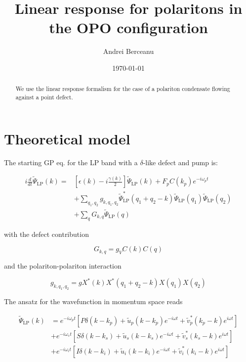 \documentclass[a4paper,prb,10pt,aps,twocolumn]{revtex4-1}
\begin{document}
\title{Linear response for polaritons in the OPO configuration}
\author{Andrei Berceanu}

\date{\today}

\begin{abstract}
We use the linear response formalism for the case of a polariton condensate flowing against a point defect.
\end{abstract}

\maketitle

\section{Theoretical model}
The starting GP eq. for the LP band with a $\delta$-like defect
and pump is:

\begin{align}
i \frac{d}{dt} \widetilde{\Psi}_{\text{LP}}(k)=&\left[\epsilon(k)-i 
\frac{\gamma(k)}{2}\right]\widetilde{\Psi}_{\text{LP}}(k) + F_p C(k_p) e^{-i 
\omega_p t} \nonumber \\
& + \sum_{q_1,q_2} g_{k,q_1,q_2} \widetilde{\Psi}^{*}_{\text{LP}}(q_1+q_2-
k)\widetilde{\Psi}_{\text{LP}}(q_1)\widetilde{\Psi}_{\text{LP}}(q_2) \nonumber \\
& + \sum_q G_{k,q} \widetilde{\Psi}_{\text{LP}}(q)
\end{align}

with the defect contribution

\begin{equation}
G_{k,q} = g_V C(k) C(q)
\end{equation}

and the polariton-polariton interaction

\begin{equation}
g_{k,q_1,q_2} = g X^*(k) X^*(q_1+q_2-k) X(q_1) X(q_2)
\end{equation}

The ansatz for the wavefunction in momentum space reads

\begin{align}
\widetilde{\Psi}_{\text{LP}}(k) &= e^{-i\omega_p t} \left[P\delta(k-k_p) + 
\widetilde{u}_p(k-k_p) e^{-i \omega t} + \widetilde{v}^*_p(k_p-k) e^{i \omega 
t}\right] \nonumber \\
& + e^{-i\omega_s t} \left[S\delta(k-k_s) + \widetilde{u}_s(k-k_s) e^{-i \omega 
t} + \widetilde{v}^*_s(k_s-k) e^{i \omega t}\right] \nonumber \\
& + e^{-i\omega_i t} \left[I\delta(k-k_i) + \widetilde{u}_i(k-k_i) e^{-i \omega 
t} + \widetilde{v}^*_i(k_i-k) e^{i \omega t}\right]
\end{align}
\end{document}

